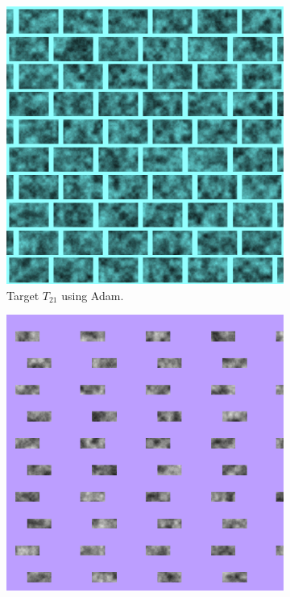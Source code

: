 \begin{figure}
\centering
\begin{subfigure}[t]{.25\textwidth}
    \centering
    \includegraphics[width=\linewidth]{img/evaluation/M2/2param/SBL_Adam_two_param_final.png}
    \caption{Target $T_{21}$ using Adam.}
    \label{fig:M2SBLFinalRenders2paramAdam}
\end{subfigure}\hspace{0.5cm}
\begin{subfigure}[t]{.25\textwidth}
    \centering
    \includegraphics[width=\linewidth]{img/evaluation/M2/random/SBL_Adam_random_final.png}

\end{subfigure}
\end{figure}
